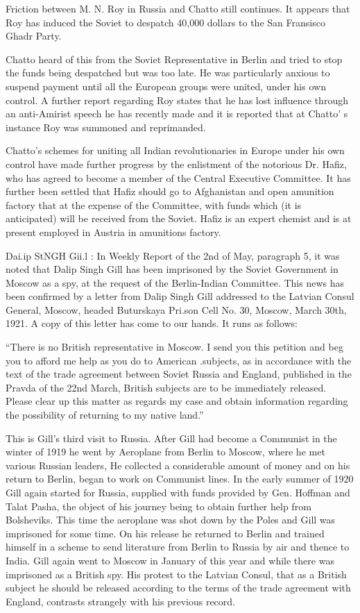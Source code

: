 Friction between M. N. Roy in Russia and Chatto still continues. It appears that Roy has induced the Soviet to despatch 40,000 dollars to the San Fransisco Ghadr Party. 

Chatto heard of this from the Soviet Representative in Berlin and tried to stop the funds being despatched but was too late. He was particularly anxious to suspend payment until all the European groups were united, under his own control. A further report regarding Roy states that he has lost influence through an anti-Amirist speech he has recently made and it is reported that at Chatto’ s instance Roy was summoned and reprimanded. 

Chatto’s schemes for uniting all Indian revolutionaries in Europe under his own control have made further progress by the enlistment of the notorious Dr. Hafiz, who has agreed to become a member of the Central Executive Committee. It has further been settled that Hafiz should go to Afghanistan and open amunition factory that at the expense of the Committee, with funds which (it is anticipated) will be received from 
the Soviet. Hafiz is an expert chemist and is at present employed in Austria in amunitions factory. 

Dai.ip StNGH Gii.l : In Weekly Report of the 2nd of May, paragraph 5, it was noted that Dalip Singh Gill has been imprisoned by the Soviet Government in Moscow as a spy, at the request of the Berlin-Indian Committee. This news has been confirmed by a letter from Dalip Singh Gill addressed to the Latvian Consul General, Moscow, headed Buturskaya Pri.son Cell No. 30, Moscow, March 30th, 1921. A copy of 
this letter has come to our hands. It runs as follows: 

“There is no British representative in Moscow. I send you this petition and beg you to afford me help as you do to American .subjects, as in accordance with the text of the trade agreement between Soviet Russia and England, published in the Pravda of the 22nd March, British subjects are to be immediately released. Please clear up this matter as regards my case and obtain information regarding the possibility of returning to my native land.” 

This is Gill’s third visit to Russia. After Gill had become a Communist in the winter of 1919 he went by Aeroplane 
from Berlin to Moscow, where he met various Russian leaders, He collected a considerable amount of money and on his return to Berlin, began to work on Communist lines. In the early summer of 1920 Gill again started for Russia, supplied with funds provided by Gen. Hoffman and Talat Pasha, the object of his journey being to obtain further help from Bolsheviks. This time the aeroplane was shot down by the Poles and Gill was imprisoned for some time. On his release he returned to Berlin and trained himself in a scheme to send literature from Berlin to Russia by air and thence to India. Gill again went to Moscow in January of this year and while there was imprisoned as a British spy. His protest 
to the Latvian Consul, that as a British subject he should be released according to the terms of the trade agreement with England, contrasts strangely with his previous record. \\


